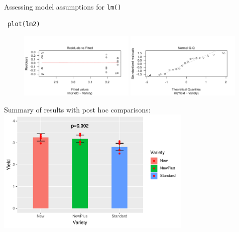 \documentclass{beamer}
\makeatletter
\newenvironment{kframe}{%
 \def\at@end@of@kframe{}%
 \ifinner\ifhmode%
  \def\at@end@of@kframe{\end{minipage}}%
  \begin{minipage}{\columnwidth}%
 \fi\fi%
 \def\FrameCommand##1{\hskip\@totalleftmargin \hskip-\fboxsep
 \colorbox{shadecolor}{##1}\hskip-\fboxsep
     \hskip-\linewidth \hskip-\@totalleftmargin \hskip\columnwidth}%
 \MakeFramed {\advance\hsize-\width
   \@totalleftmargin\z@ \linewidth\hsize
   \@setminipage}}%
 {\par\unskip\endMakeFramed%
 \at@end@of@kframe}
\newenvironment{knitrout}{}{} %
\makeatother
\begin{document}
\begin{frame}[fragile]{Assessing model assumptions for \texttt{lm()}}
     \begin{knitrout}
\color{fgcolor}\begin{kframe}
\footnotesize
\begin{verbatim}
 plot(lm2)
\end{verbatim}
\end{kframe}
\end{knitrout}
 
 \begin{figure}
  \includegraphics[width=0.49\textwidth]{Figures/assump1}
  \includegraphics[width=0.49\textwidth]{Figures/assump2}
 \end{figure}

\end{frame}


\begin{frame}{Summary of results with post hoc comparisons:}
\centering
\includegraphics[width=0.7\textwidth]{Figures/wheatres}
\end{frame}
\end{document}
